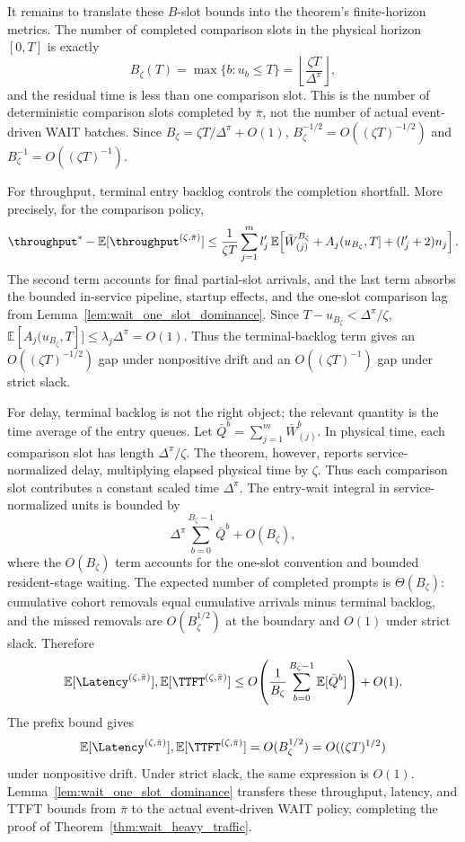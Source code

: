 It remains to translate these \(B\)-slot bounds into the theorem's finite-horizon metrics. The number of completed comparison slots in the physical horizon \([0,T]\) is exactly
\[
    B_\zeta(T)=\max\{b:u_b\le T\}
    =\left\lfloor\frac{\zeta T}{\Delta^\pi}\right\rfloor,
\]
and the residual time is less than one comparison slot. This is the number of deterministic comparison slots completed by \(\bar\pi\), not the number of actual event-driven WAIT batches. Since \(B_\zeta=\zeta T/\Delta^\pi+O(1)\), \(B_\zeta^{-1/2}=O((\zeta T)^{-1/2})\) and \(B_\zeta^{-1}=O((\zeta T)^{-1})\).

For throughput, terminal entry backlog controls the completion shortfall. More precisely, for the comparison policy,
\[
    \throughput^*-\mathbb{E}[\throughput^{(\zeta,\bar\pi)}]
    \le
    \frac{1}{\zeta T}\sum_{j=1}^m l_j^\prime\,
    \mathbb{E}\!\left[
    \bar W^{B_\zeta}_{(j)}
    +A_j(u_{B_\zeta},T]
    +(l_j^\prime+2)n_j
    \right].
\]
The second term accounts for final partial-slot arrivals, and the last term absorbs the bounded in-service pipeline, startup effects, and the one-slot comparison lag from Lemma~\ref{lem:wait_one_slot_dominance}. Since \(T-u_{B_\zeta}<\Delta^\pi/\zeta\), \(\mathbb{E}[A_j(u_{B_\zeta},T]]\le \lambda_j\Delta^\pi=O(1)\). Thus the terminal-backlog term gives an \(O((\zeta T)^{-1/2})\) gap under nonpositive drift and an \(O((\zeta T)^{-1})\) gap under strict slack.

For delay, terminal backlog is not the right object; the relevant quantity is the time average of the entry queues. Let \(\bar Q^b=\sum_{j=1}^m \bar W^b_{(j)}\). In physical time, each comparison slot has length \(\Delta^\pi/\zeta\). The theorem, however, reports service-normalized delay, multiplying elapsed physical time by \(\zeta\). Thus each comparison slot contributes a constant scaled time \(\Delta^\pi\). The entry-wait integral in service-normalized units is bounded by
\[
    \Delta^\pi\sum_{b=0}^{B_\zeta-1}\bar Q^b+O(B_\zeta),
\]
where the \(O(B_\zeta)\) term accounts for the one-slot convention and bounded resident-stage waiting. The expected number of completed prompts is \(\Theta(B_\zeta)\): cumulative cohort removals equal cumulative arrivals minus terminal backlog, and the missed removals are \(O(B_\zeta^{1/2})\) at the boundary and \(O(1)\) under strict slack. Therefore
\[
    \mathbb{E}[\Latency^{(\zeta,\bar\pi)}],
    \mathbb{E}[\TTFT^{(\zeta,\bar\pi)}]
    \le
    O\!\left(
    \frac{1}{B_\zeta}\sum_{b=0}^{B_\zeta-1}
    \mathbb{E}[\bar Q^b]
    \right)+O(1).
\]
The prefix bound gives
\[
    \mathbb{E}[\Latency^{(\zeta,\bar\pi)}],
    \mathbb{E}[\TTFT^{(\zeta,\bar\pi)}]
    =
    O(B_\zeta^{1/2})
    =
    O((\zeta T)^{1/2})
\]
under nonpositive drift. Under strict slack, the same expression is \(O(1)\). Lemma~\ref{lem:wait_one_slot_dominance} transfers these throughput, latency, and TTFT bounds from \(\bar\pi\) to the actual event-driven WAIT policy, completing the proof of Theorem~\ref{thm:wait_heavy_traffic}.
